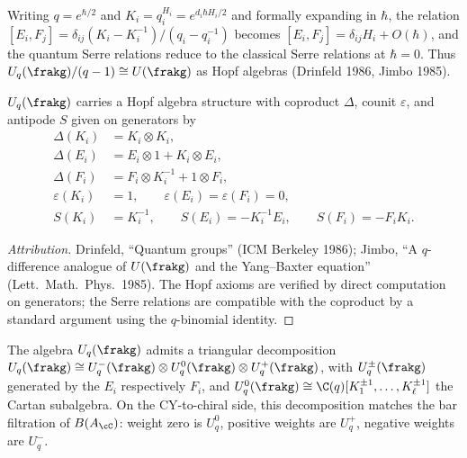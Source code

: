 \begin{remark}
\label{rem:qgf-classical-limit}
Writing $q = e^{\hbar/2}$ and $K_i = q_i^{H_i} = e^{d_i \hbar H_i / 2}$ and formally expanding in $\hbar$, the relation $[E_i, F_j] = \delta_{ij} (K_i - K_i^{-1})/(q_i - q_i^{-1})$ becomes $[E_i, F_j] = \delta_{ij} H_i + O(\hbar)$, and the quantum Serre relations reduce to the classical Serre relations at $\hbar = 0$. Thus $U_q(\frakg)/(q - 1) \cong U(\frakg)$ as Hopf algebras (Drinfeld 1986, Jimbo 1985).
\end{remark}

\begin{proposition}
\label{prop:qgf-hopf}
$U_q(\frakg)$ carries a Hopf algebra structure with coproduct $\Delta$, counit $\varepsilon$, and antipode $S$ given on generators by
\begin{align}
 \Delta(K_i) &= K_i \otimes K_i, \\
 \Delta(E_i) &= E_i \otimes 1 + K_i \otimes E_i, \\
 \Delta(F_i) &= F_i \otimes K_i^{-1} + 1 \otimes F_i, \\
 \varepsilon(K_i) &= 1, \qquad \varepsilon(E_i) = \varepsilon(F_i) = 0, \\
 S(K_i) &= K_i^{-1}, \qquad S(E_i) = -K_i^{-1} E_i, \qquad S(F_i) = -F_i K_i.
\end{align}
\end{proposition}

\begin{proof}[Attribution]
Drinfeld, ``Quantum groups'' (ICM Berkeley 1986); Jimbo, ``A $q$-difference analogue of $U(\frakg)$ and the Yang--Baxter equation'' (Lett.\ Math.\ Phys.\ 1985). The Hopf axioms are verified by direct computation on generators; the Serre relations are compatible with the coproduct by a standard argument using the $q$-binomial identity.
\end{proof}

The algebra $U_q(\frakg)$ admits a triangular decomposition $U_q(\frakg) \cong U_q^-(\frakg) \otimes U_q^0(\frakg) \otimes U_q^+(\frakg)$, with $U_q^{\pm}(\frakg)$ generated by the $E_i$ respectively $F_i$, and $U_q^0(\frakg) \cong \C(q)[K_1^{\pm 1}, \ldots, K_\ell^{\pm 1}]$ the Cartan subalgebra. On the CY-to-chiral side, this decomposition matches the bar filtration of $B(A_\cC)$: weight zero is $U_q^0$, positive weights are $U_q^+$, negative weights are $U_q^-$.


